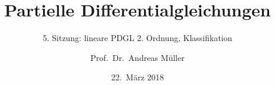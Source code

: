 \documentclass[handout]{beamer}
\title[]{Partielle Differentialgleichungen}
\subtitle{5. Sitzung: lineare PDGL 2. Ordnung, Klassifikation}
\date[22.~März 2018]{22.~März 2018}
\author{Prof.~Dr.~Andreas Müller}
\begin{document}
\begin{frame}
\titlepage

\end{frame}


\end{document}
